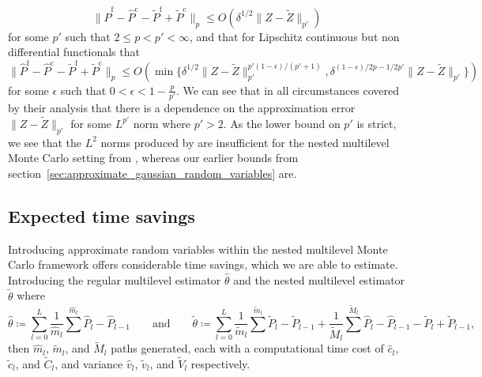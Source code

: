 \documentclass[manuscript,review]{acmart}
\begin{document}
\begin{equation*}
\lVert \hat{P}^{\mathrm{f}} - \hat{P}^{\mathrm{c}} - \tilde{P}^{\mathrm{f}} + \tilde{P}^{\mathrm{c}}\rVert_p 
\leq O(\delta^{1/2} \lVert Z - \tilde{Z} \rVert_{p'}) 
\end{equation*}
for some  $ p' $ such that $ 2 \leq p < p' < \infty $, and that for Lipschitz continuous but non differential functionals that 
\begin{equation*}
\lVert \hat{P}^{\mathrm{f}} - \hat{P}^{\mathrm{c}} - \tilde{P}^{\mathrm{f}} + \tilde{P}^{\mathrm{c}}\rVert_p 
\leq O(\min\{
\delta^{1/2} \lVert Z - \tilde{Z} \rVert_{p'}^{p'(1-\epsilon)/(p'+1)},
\delta^{(1-\epsilon)/2p -1/2p'}    \lVert Z - \tilde{Z} \rVert_{p'}
\})
\end{equation*}
for some  $ \epsilon $ such that $ 0<\epsilon<1 - \tfrac{p}{p'} $. We can see that in all circumstances covered by their analysis that there is a dependence on the approximation error $  \lVert Z - \tilde{Z} \rVert_{p'} $ for some $ L^{p'} $ norm where $ p' > 2 $. As the lower bound on $ p' $ is strict, we see that the $ L^2 $ norms produced by \citet{giles2019random_quadrature} are insufficient for the nested multilevel Monte Carlo setting from \citet{giles2020approximate}, whereas our earlier bounds from section~\ref{sec:approximate_gaussian_random_variables} are. 



\subsection{Expected time savings}

Introducing approximate random variables within the nested multilevel Monte Carlo framework offers considerable time savings, which we are able to estimate. Introducing the regular multilevel estimator $ \hat{\theta} $ and the nested multilevel estimator $ \tilde{\theta} $ where
\begin{equation*}
\hat{\theta}  \coloneqq \sum_{l=0}^{L} \dfrac{1}{\hat{m}_l} \sum^{\hat{m}_l} \hat{P}_l - \hat{P}_{l-1}
\qquad \text{and} \qquad
\tilde{\theta} \coloneqq \sum_{l=0}^L \dfrac{1}{\tilde{m}_l} \sum^{\tilde{m}_l} \tilde{P}_l - \tilde{P}_{l-1} + \dfrac{1}{\tilde{M}_l} \sum^{\tilde{M}_l} \hat{P}_l - \hat{P}_{l-1} - \tilde{P}_l + \tilde{P}_{l-1},
\end{equation*}
then $ \hat{m}_l $, $ \tilde{m}_l $, and $ \tilde{M}_l $ paths generated, each with a computational time cost of $ \hat{c}_l $, $ \tilde{c}_l $, and $ \tilde{C}_l $, and variance $ \hat{v}_l $, $ \tilde{v}_l $, and $ \tilde{V}_l $ respectively. 
\end{document}
